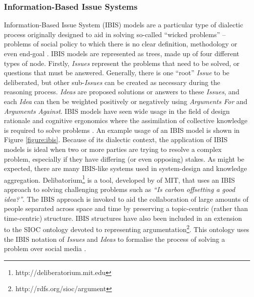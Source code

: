 \subsubsection{Information-Based Issue Systems}
Information-Based Issue System (IBIS) models are a particular type of dialectic process originally designed to aid in solving so-called ``wicked problems'' \citep{Kunz1970} -- problems of social policy to which there is no clear definition, methodology or even end-goal \citep{Rittel1973}. IBIS models are represented as trees, made up of four different types of node. Firstly, \textit{Issues} represent the problems that need to be solved, or questions that must be answered. Generally, there is one ``root'' \textit{Issue} to be deliberated, but other sub-\textit{Issues} can be created as necessary during the reasoning process. \textit{Ideas} are proposed solutions or answers to these \textit{Issues}, and each \textit{Idea} can then be weighted positively or negatively using \textit{Arguments For} and \textit{Arguments Against}. IBIS models have seen wide usage in the field of design rationale and cognitive ergonomics where the assimilation of collective knowledge is required to solve problems \citep{Conklin1987, Aurisicchio2013}. An example usage of an IBIS model is shown in Figure \ref{figure:ibis}. Because of its dialectic context, the application of IBIS models is ideal when two or more parties are trying to resolve a complex problem, especially if they have differing (or even opposing) stakes. As might be expected, there are many IBIS-like systems used in system-design and knowledge aggregation. Delibatorium\footnote{http://deliberatorium.mit.edu} is a tool, developed by \citet{Klein2010} of MIT, that uses an IBIS approach to solving challenging problems such as \textit{``Is carbon offsetting a good idea?''}. The IBIS approach is invoked to aid the collaboration of large amounts of people separated across space and time by preserving a topic-centric (rather than time-centric) structure. IBIS structures have also been included in an extension to the SIOC ontology devoted to representing argumentation\footnote{http://rdfs.org/sioc/argument}. This ontology uses the IBIS notation of \textit{Issues} and \textit{Ideas} to formalise the process of solving a problem over social media \citep{Lange2008}.




